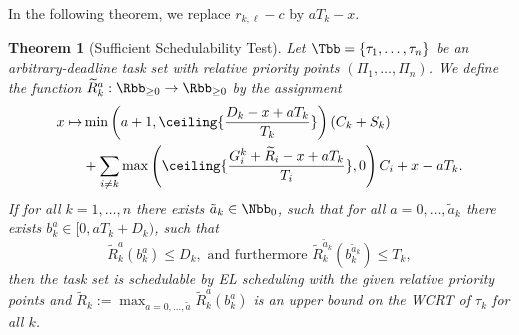 \documentclass[conference]{IEEEtran}
\newtheorem{thm}{Theorem}%
\theoremstyle{definition}
\theoremstyle{remark}
\newcommand{\Rtilde}{\widetilde{R}}
\begin{document}
	In the following theorem, we replace $r_{k,\ell}-c$ by $aT_k-x$.

	\begin{thm}[Sufficient Schedulability Test]\label{thm:suff_sched_test_var}
		Let $\Tbb=\{\tau_1, \dots, \tau_n\}$ be an arbitrary-deadline task set with relative priority points $(\Pi_1, \dots, \Pi_n)$.
		We define the function $\Rtilde^a_k : \Rbb_{\geq 0} \to \Rbb_{\geq 0}$ by the assignment 
		\begin{equation}\label{eq:thm:suff_sched_test_var}
		\begin{aligned}
		x \mapsto &\min\left(a+1, \ceiling{\frac{D_k-x+aT_k}{T_k}}\right)(C_k+S_k)
		\\&+ \sum_{i \neq k} \max \left( \ceiling{\frac{G^k_i + \Rtilde_i-x+aT_k}{T_i}},0 \right) C_i
		+ x-aT_k.
		\end{aligned}
		\end{equation}
		If for all $k=1,\dots,n$ there exists $\tilde a_k \in \Nbb_0$, such that for all $a = 0,\dots,\tilde a_k$ there exists $b^a_k \in [0,a T_k + D_k)$, such that 
		\begin{equation}
			\Rtilde^a_k(b^a_k) \leq D_k,
			\text{ and furthermore }
			\Rtilde^{\tilde a_k}_k(b^{\tilde a_k}_k) \leq T_k,
		\end{equation}
		then the task set is schedulable by EL scheduling with the given relative priority points and $\Rtilde_k := \max_{a = 0, \dots, \tilde a} \Rtilde^a_k(b^a_k)$ is an upper bound on the WCRT of $\tau_k$ for all $k$. 
	\end{thm}
	
\end{document}
